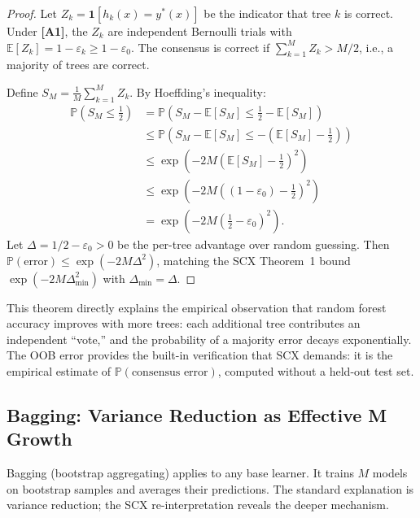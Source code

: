 \documentclass[12pt,a4paper]{article}
\theoremstyle{definition}
\newcommand{\SCX}{\textsc{SCX}}
\newcommand{\E}{\mathbb{E}}
\newcommand{\Pbb}{\mathbb{P}}
\newcommand{\ind}[1]{\mathbf{1}[#1]}
\newcommand{\asmTag}[1]{\textsf{\textbf{[A#1]}}}
\begin{document}
\begin{proof}
Let $Z_k = \ind{h_k(x) = y^*(x)}$ be the indicator that tree $k$ is correct. Under \asmTag{1}, the $Z_k$ are independent Bernoulli trials with $\E[Z_k] = 1 - \varepsilon_k \ge 1 - \varepsilon_0$. The consensus is correct if $\sum_{k=1}^M Z_k > M/2$, i.e., a majority of trees are correct.

Define $S_M = \frac{1}{M}\sum_{k=1}^M Z_k$. By Hoeffding's inequality:
\begin{align}
    \Pbb\left(S_M \le \frac{1}{2}\right) &= \Pbb\left(S_M - \E[S_M] \le \frac{1}{2} - \E[S_M]\right) \\
    &\le \Pbb\left(S_M - \E[S_M] \le -\left(\E[S_M] - \frac{1}{2}\right)\right) \\
    &\le \exp\left(-2M\left(\E[S_M] - \frac{1}{2}\right)^2\right) \\
    &\le \exp\left(-2M\left((1-\varepsilon_0) - \frac{1}{2}\right)^2\right) \\
    &= \exp\left(-2M\left(\frac{1}{2} - \varepsilon_0\right)^2\right).
\end{align}
Let $\Delta = 1/2 - \varepsilon_0 > 0$ be the per-tree advantage over random guessing. Then $\Pbb(\text{error}) \le \exp(-2M\Delta^2)$, matching the \SCX{} Theorem~1 bound $\exp(-2M\Delta_{\min}^2)$ with $\Delta_{\min} = \Delta$.
\end{proof}

This theorem directly explains the empirical observation that random forest accuracy improves with more trees: each additional tree contributes an independent ``vote,'' and the probability of a majority error decays exponentially. The OOB error provides the built-in verification that \SCX{} demands: it is the empirical estimate of $\Pbb(\text{consensus error})$, computed without a held-out test set.

\subsection{Bagging: Variance Reduction as Effective M Growth}

Bagging (bootstrap aggregating) applies to any base learner. It trains $M$ models on bootstrap samples and averages their predictions. The standard explanation is variance reduction; the \SCX{} re-interpretation reveals the deeper mechanism.
\end{document}
